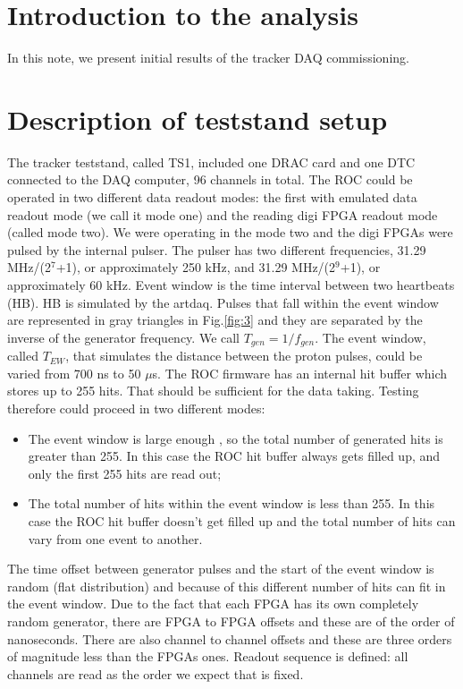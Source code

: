 \section {Introduction to the analysis}

In this note, we present initial results of the tracker DAQ commissioning.
\section{Description of teststand setup}
  The tracker teststand, called TS1, included one DRAC card and one DTC connected to the DAQ computer, 96 channels in total.
The ROC could be operated in two different data readout modes: the first with
emulated data readout mode (we call it mode one) and the reading digi FPGA
readout mode (called mode two). We were operating in the mode two and the
 digi FPGAs were pulsed by the internal pulser.
  The pulser has two different frequencies,  31.29 MHz/(2$^7$+1), or approximately 250 kHz, 
and 31.29 MHz/(2$^9$+1), or approximately 60 kHz.
Event window is the time interval between two heartbeats (HB).
HB is simulated by the artdaq. 
Pulses that fall within the event window are represented in gray triangles in Fig.\ref{fig:3} and 
they are separated by the inverse of the generator frequency. We call $T_{gen}=1/f_{gen}$.
The event window, called $T_{EW}$, that simulates the distance between the proton pulses, 
could be varied from 700 ns to 50 $\mu$s.
The ROC firmware has an internal hit buffer which stores up to 255 hits.
That should be sufficient for the data taking.
Testing therefore could proceed in two different modes:
  \begin{itemize}
  \item
    The event window is large enough , so the total number of generated hits is greater than 255. In this case
    the ROC hit buffer always gets filled up, and only the first 255 hits are read out;
  \item
    The total number of hits within the event window is less than 255.
    In this case the ROC hit buffer doesn't get filled up and the total number of hits can vary from one event to another.
  \end{itemize}
The time offset between generator pulses and the start of the event window
is random (flat distribution) and because of this different number of hits 
can fit in the event window.
Due to the fact that each FPGA has its own completely random generator, there are FPGA to FPGA offsets
and these are of the order of nanoseconds.
There are also channel to channel offsets and these are three orders of magnitude less than the FPGAs ones.
Readout sequence is defined: all channels are read as the order we expect that is fixed.

